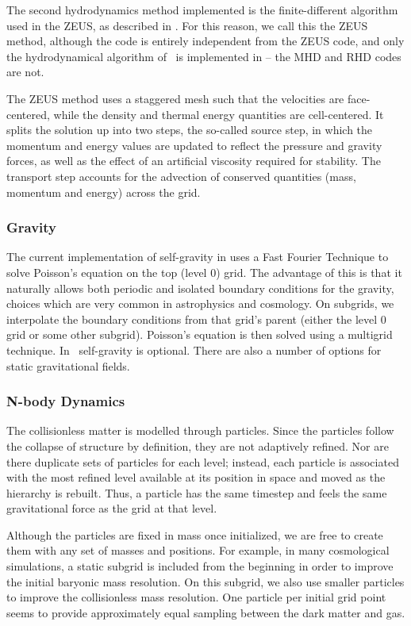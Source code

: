 The second hydrodynamics method implemented is the finite-different algorithm used in the ZEUS, as described in \citet{Stone92a}.  For this reason, we call this the ZEUS method, although the code is entirely independent from the ZEUS code, and only the hydrodynamical algorithm of \zeus\ is implemented in \enzo -- the MHD and RHD codes are not.

The ZEUS method uses a staggered mesh such that the velocities are face-centered, while the density and thermal energy quantities are cell-centered.  It splits the solution up into two steps, the so-called source step, in which the momentum and energy values are updated to reflect the pressure and gravity forces, as well as the effect of an artificial viscosity required for stability.  The transport step accounts for the advection of conserved quantities (mass, momentum and energy) across the grid.

\subsubsection{Gravity}

The current implementation of self-gravity in \enzo uses a Fast Fourier Technique \citep{Hockney88} to solve Poisson's equation on the top (level 0) grid.  The advantage of this is that it naturally allows both periodic and isolated boundary conditions for the gravity, choices which are very common in astrophysics and cosmology.  On subgrids, we interpolate the boundary conditions from that grid's parent (either the level 0 grid or some other subgrid).  Poisson's equation is then solved using a multigrid technique.  In \enzo\, self-gravity is optional.  There are also a number of options for static gravitational fields.

\subsubsection{N-body Dynamics}

The collisionless matter is modelled through particles.  Since the
particles follow the collapse of structure by definition, they are not
adaptively refined.  Nor are there duplicate sets of particles for
each level; instead, each particle is associated with the most refined
level available at its position in space and moved as the hierarchy is
rebuilt.  Thus, a particle has the same timestep and feels the same
gravitational force as the grid at that level.

Although the particles are fixed in mass once initialized, we are free
to create them with any set of masses and positions.  For example, in
many cosmological simulations, a static subgrid is included from the
beginning in order to improve the initial baryonic mass resolution.
On this subgrid, we also use smaller particles to improve the
collisionless mass resolution.  One particle per initial grid point
seems to provide approximately equal sampling between the dark matter
and gas.

